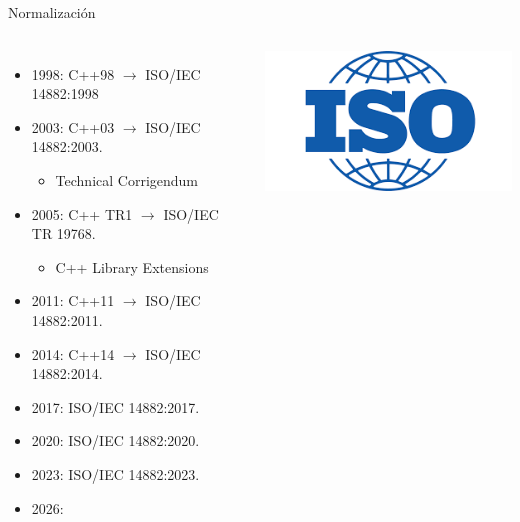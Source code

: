 \begin{frame}[t]{Normalización}
\vspace{-1em}
\begin{columns}[T]

\begin{itemize}
  \item 1998: C++98 $\rightarrow$ ISO/IEC 14882:1998
  \item 2003: C++03 $\rightarrow$ ISO/IEC 14882:2003.
    \begin{itemize}
      \item Technical Corrigendum
    \end{itemize}
  \item 2005: C++ TR1 $\rightarrow$ ISO/IEC TR 19768.
    \begin{itemize}
      \item C++ Library Extensions
    \end{itemize}
  \item 2011: C++11 $\rightarrow$ ISO/IEC 14882:2011.
  \item 2014: C++14 $\rightarrow$ ISO/IEC 14882:2014. 
  \item 2017: ISO/IEC 14882:2017.
  \item 2020: ISO/IEC 14882:2020.
  \item 2023: ISO/IEC 14882:2023.
  \item 2026: 
\end{itemize}

\includegraphics[width=.8\textwidth]{logos/iso.png}
\end{columns}

\end{frame}

